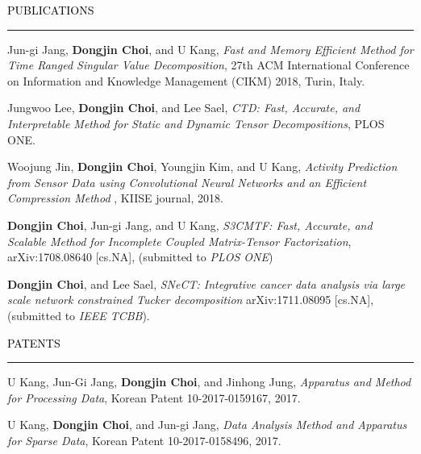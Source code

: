 \documentclass{resume} %
\renewenvironment{rSection}[1]{
	\sectionskip
	\textcolor{Black}{\MakeUppercase{#1}}
	\sectionlineskip
	\hrule
	\begin{list}{}{
			\setlength{\leftmargin}{1.5em}
		}
		\item[]
	}{
	\end{list}
}
\begin{document}
\begin{rSection}{Publications}
\begin{rSubsection}{}{}{}{}
	\vspace*{-2.5mm}
	\item Jun-gi Jang, \textbf{Dongjin Choi}, and U Kang, \textit{Fast and Memory Efficient Method for Time Ranged Singular Value Decomposition}, 27th ACM International Conference on Information and Knowledge Management (CIKM) 2018, Turin, Italy.
	
	\item Jungwoo Lee, \textbf{Dongjin Choi}, and Lee Sael, \textit{CTD: Fast, Accurate, and Interpretable Method for Static and Dynamic Tensor Decompositions}, PLOS ONE.
	
	\item Woojung Jin, \textbf{Dongjin Choi}, Youngjin Kim, and U Kang, \textit{Activity Prediction from Sensor Data using Convolutional Neural Networks and an Efficient Compression Method }, KIISE journal, 2018.
	
	\item \textbf{Dongjin Choi}, Jun-gi Jang, and U Kang, \textit{S3CMTF: Fast, Accurate, and Scalable Method for Incomplete Coupled Matrix-Tensor Factorization}, arXiv:1708.08640 [cs.NA], (submitted to \textit{PLOS ONE})
	
	\item \textbf{Dongjin Choi}, and Lee Sael, \textit{SNeCT: Integrative cancer data analysis via large scale network constrained Tucker decomposition} arXiv:1711.08095 [cs.NA], (submitted to \textit{IEEE TCBB}).
	
\end{rSubsection}

\end{rSection}
\vspace{-3mm}



\begin{rSection}{Patents}
	\begin{rSubsection}{}{}{}{}
		\vspace*{-2.5mm}
		\item U Kang, Jun-Gi Jang, \textbf{Dongjin Choi}, and Jinhong Jung, \textit{Apparatus and Method for Processing Data}, Korean Patent 10-2017-0159167, 2017.
		\item U Kang, \textbf{Dongjin Choi}, and Jun-gi Jang, \textit{Data Analysis Method and Apparatus for Sparse Data}, Korean Patent 10-2017-0158496, 2017.
	\end{rSubsection}
	
\end{rSection}
\vspace{-3mm}
\end{document}

